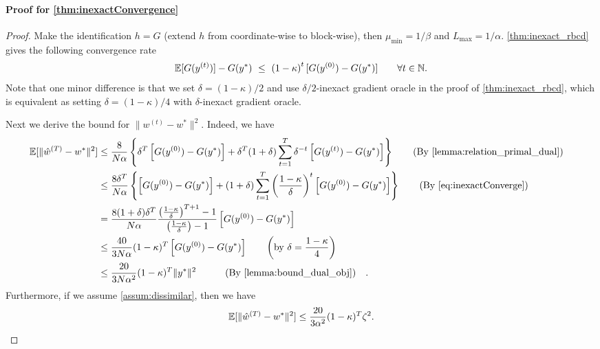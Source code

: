 \paragraph{Proof for \autoref{thm:inexactConvergence}}
\begin{proof}
    Make the identification $h = G$ (extend $h$ from coordinate-wise to block-wise), then $\mu_{\min} = 1/\beta$ and $L_{\max} = 1/\alpha$. \autoref{thm:inexact_rbcd} gives the following convergence rate
    \begin{align}
        \mathbb{E}[ G( y^{(t)} ) ] - G( y^* ) ~\leq~ \left( 1 - \kappa \right)^t [ G( y^{(0)} ) - G( y^* ) ] \qquad \forall t \in \mathbb{N}. \label{eq:inexactConverge}
    \end{align}
    Note that one minor difference is that we set $\delta = (1-\kappa)/2$ and use $\delta/2$-inexact gradient oracle in the proof of \autoref{thm:inexact_rbcd}, which is equivalent as setting $\delta = (1-\kappa)/4$ with $\delta$-inexact gradient oracle. 
    
    Next we derive the bound for $\|w^{(t)} - w^*\|^2$. Indeed, we have
    \begin{align*}
        \mE[\|\hat w^{(T)} - w^*\|^2] &\leq \frac{8}{N\alpha} \left\{ \delta^T\left[G(y^{(0)}) - G(y^*)\right] + \delta^T(1+\delta)\sum_{t=1}^T \delta^{-t}\left[G(y^{(t)}) - G(y^*)\right]\right\} \quad \text{(By \autoref{lemma:relation_primal_dual})}
        \\&\leq \frac{8\delta^T}{N\alpha} \left\{ \left[G(y^{(0)}) - G(y^*)\right] + (1+\delta)\sum_{t=1}^T \left(\frac{1 - \kappa}{\delta}\right)^t\left[G(y^{(0)}) - G(y^*)\right]\right\} \quad \text{(By \autoref{eq:inexactConverge})}
        \\&= \frac{8(1+\delta)\delta^T}{N\alpha} \frac{ \left(\frac{1 - \kappa}{\delta}\right)^{T+1} - 1}{\left(\frac{1 - \kappa}{\delta}\right) - 1} \left[G(y^{(0)}) - G(y^*)\right]
        \\ &\leq \frac{40}{3N\alpha}(1-\kappa)^T  \left[G(y^{(0)}) - G(y^*)\right] \qquad \left(\mbox{by}~ \delta = \frac{1-\kappa}{4}\right) 
        \\&\leq \frac{20}{3N\alpha^2}(1-\kappa)^T  \|y^*\|^2 \qquad \text{(By \autoref{lemma:bound_dual_obj})}.
    \end{align*}
    Furthermore, if we assume \autoref{assum:dissimilar}, then we have 
    \[
        \mathbb{E}[\|\hat w^{(T)} - w^*\|^2] \leq \frac{20}{3\alpha^2}(1-\kappa)^T  \zeta^2.
    \]
\end{proof}

